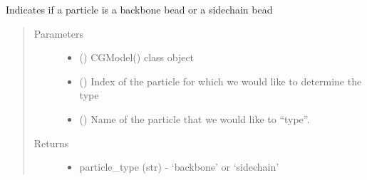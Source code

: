 \documentclass[letterpaper,12pt,english,openany,oneside]{sphinxmanual}
\begin{document}
\begin{fulllineitems}
\begin{fulllineitems}
\begin{quote}
\begin{description}
\end{description}\end{quote}

\end{fulllineitems}


\begin{fulllineitems}
\label{\detokenize{cg_model:cg_model.cgmodel.CGModel.get_particle_type}}
Indicates if a particle is a backbone bead or a sidechain bead
\begin{quote}\begin{description}
\item[{Parameters}] \leavevmode\begin{itemize}
\item {} 
 () \textendash{} CGModel() class object

\item {} 
 () \textendash{} Index of the particle for which we would like to determine the type

\item {} 
 () \textendash{} Name of the particle that we would like to “type”.

\end{itemize}

\item[{Returns}] \leavevmode
\begin{itemize}
\item {} 
particle\_type (str) - ‘backbone’ or ‘sidechain’

\end{itemize}


\end{description}\end{quote}

\end{fulllineitems}


\end{fulllineitems}
\end{document}

